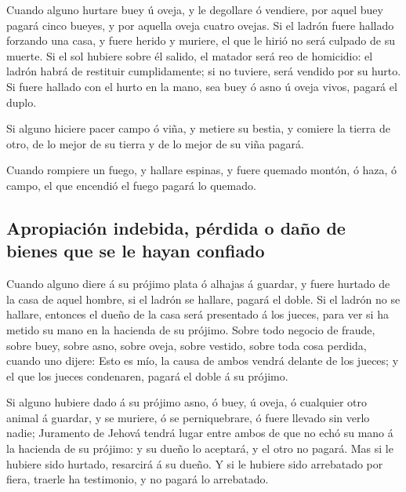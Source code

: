  Cuando alguno hurtare buey ú oveja, y le degollare ó
vendiere, por aquel buey pagará cinco bueyes, y por aquella oveja cuatro
ovejas.  Si el ladrón fuere hallado forzando una casa, y
fuere herido y muriere, el que le hirió no será culpado de su muerte.
 Si el sol hubiere sobre él salido, el matador será reo de
homicidio: el ladrón habrá de restituir cumplidamente; si no tuviere,
será vendido por su hurto.  Si fuere hallado con el hurto en
la mano, sea buey ó asno ú oveja vivos, pagará el duplo.

 Si alguno hiciere pacer campo ó viña, y metiere su bestia,
y comiere la tierra de otro, de lo mejor de su tierra y de lo mejor de
su viña pagará.

 Cuando rompiere un fuego, y hallare espinas, y fuere
quemado montón, ó haza, ó campo, el que encendió el fuego pagará lo
quemado.

\hypertarget{apropiaciuxf3n-indebida-puxe9rdida-o-dauxf1o-de-bienes-que-se-le-hayan-confiado}{%
\subsection{Apropiación indebida, pérdida o daño de bienes que se le
hayan
confiado}\label{apropiaciuxf3n-indebida-puxe9rdida-o-dauxf1o-de-bienes-que-se-le-hayan-confiado}}

 Cuando alguno diere á su prójimo plata ó alhajas á guardar,
y fuere hurtado de la casa de aquel hombre, si el ladrón se hallare,
pagará el doble.  Si el ladrón no se hallare, entonces el
dueño de la casa será presentado á los jueces, para ver si ha metido su
mano en la hacienda de su prójimo.  Sobre todo negocio de
fraude, sobre buey, sobre asno, sobre oveja, sobre vestido, sobre toda
cosa perdida, cuando uno dijere: Esto es mío, la causa de ambos vendrá
delante de los jueces; y el que los jueces condenaren, pagará el doble á
su prójimo.

 Si alguno hubiere dado á su prójimo asno, ó buey, ú oveja,
ó cualquier otro animal á guardar, y se muriere, ó se perniquebrare, ó
fuere llevado sin verlo nadie;  Juramento de Jehová tendrá
lugar entre ambos de que no echó su mano á la hacienda de su prójimo: y
su dueño lo aceptará, y el otro no pagará.  Mas si le
hubiere sido hurtado, resarcirá á su dueño.  Y si le
hubiere sido arrebatado por fiera, traerle ha testimonio, y no pagará lo
arrebatado.

